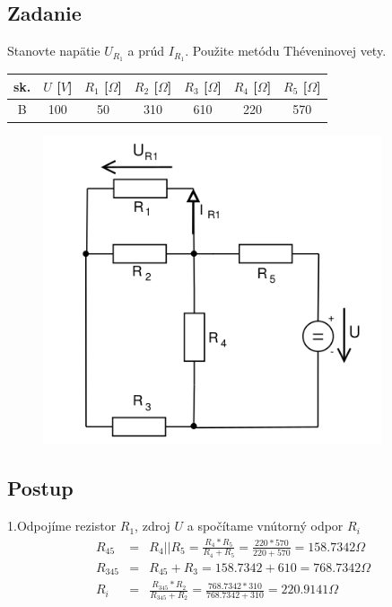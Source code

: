 \documentclass[a4paper,oneside,12pt]{article}
\begin{document}
\subsection{Zadanie}
Stanovte napätie $U_{R_{1}}$ a prúd $I_{R_{1}}$. Použite metódu Théveninovej vety.

\begin{table}[h]
		\begin{center}		
			\begin{tabular}{|c|c|c|c|c|c|c|}
					\hline
					sk. & $U$ [$V$] & $R_{1}$ [$\Omega$] &  $R_{2}$ [$\Omega$] & $R_{3}$ [$\Omega$] & $R_{4}$ [$\Omega$] & $R_{5}$ [$\Omega$] \\
					\hline
					B & 100 & 50 & 310 & 610 & 220 & 570 \\
					\hline
			\end{tabular}
		\end{center}
	\end{table}
	
\begin{figure}[h]
		\begin{center}
			\includegraphics[width=10cm]{circuit_2.png}
		\end{center}
\end{figure}

\maketitle
\subsection{Postup}

1.Odpojíme rezistor $R_{1}$, zdroj $U$ a spočítame vnútorný odpor $R_{i}$ 
\begin{eqnarray*}
	R_{45} &= & R_{4}||R_{5} = \frac{R_{4} * R_{5}}{R_{4} + R_{5}} = \frac{220 * 570}{220 + 570} = 158.7342 \Omega\\
	R_{345} &= & R_{45} + R_{3} = 158.7342 + 610 = 768.7342 \Omega\\
	R_{i} &= & \frac{R_{345} * R_{2}}{R_{345} + R_{2}} = \frac{768.7342 * 310}{768.7342 + 310} = 220.9141 \Omega\\   
\end{eqnarray*}
\end{document}
